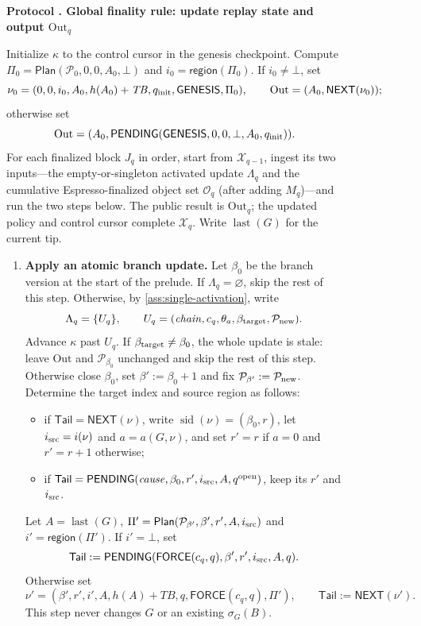 \documentclass[11pt,a4paper]{article}
\newcommand{\TB}{\mathit{TB}}
\newcommand{\tagg}[1]{\ensuremath{\mathsf{#1}}}
\newcounter{protocol}
\newenvironment{protocol}[3][htbp]{\begin{figure}[#1]\refstepcounter{protocol}\label{#2}
\begin{mdframed}[linewidth=.6pt,skipabove=0pt,skipbelow=0pt,
innertopmargin=7pt,innerbottommargin=7pt]\small
\textbf{Protocol \theprotocol. #3}\par\smallskip}{\end{mdframed}\end{figure}}
\begin{document}
\begin{protocol}[H]{alg:global-rule}{Global finality rule: update replay state and output $\mathrm{Out}_q$}
Initialize $\kappa$ to the control cursor in the genesis checkpoint. Compute
$\Pi_0=\tagg{Plan}(\mathcal P_0,0,0,A_0,\bot)$ and
$i_0=\tagg{region}(\Pi_0)$.  If $i_0\ne\bot$, set
\[
 \nu_0=(0,0,i_0,A_0,h(A_0)+\TB,q_{\rm init},\tagg{GENESIS},\Pi_0),
 \qquad \mathrm{Out}=(A_0,\tagg{NEXT}(\nu_0));
\]
otherwise set
\[
 \mathrm{Out}=(A_0,
 \tagg{PENDING}(\tagg{GENESIS},0,0,\bot,A_0,q_{\rm init})).
\]
For each finalized block $J_q$ in order, start from $\mathcal X_{q-1}$,
ingest its two inputs---the empty-or-singleton activated update
$\Lambda_q$ and the cumulative
Espresso-finalized object set $\mathcal O_q$ (after adding $M_q$)---and
run the two steps below. The public result is $\mathrm{Out}_q$; the
updated policy and control cursor complete $\mathcal X_q$. Write
$\operatorname{last}(G)$ for the current tip.
\begin{enumerate}[label=\textbf{\arabic*)},itemsep=3pt]
\item \textbf{Apply an atomic branch update.}
Let $\beta_0$ be the branch version at the start of the prelude. If
$\Lambda_q=\varnothing$, skip the rest of this step. Otherwise, by
\cref{ass:single-activation}, write
\[
 \Lambda_q=\{U_q\},\qquad
 U_q=(\mathit{chain},c_q,\theta_a,\beta_{\rm target},\mathcal P_{\rm new}).
\]
Advance $\kappa$ past $U_q$. If $\beta_{\rm target}\ne\beta_0$, the
whole update is stale: leave $\mathrm{Out}$ and $\mathcal P_{\beta_0}$
unchanged and skip the rest of this step. Otherwise close $\beta_0$, set
$\beta':=\beta_0+1$ and fix $\mathcal P_{\beta'}:=\mathcal P_{\rm new}$.
Determine the target index and source region as follows:
  \begin{itemize}[itemsep=1pt]
  \item if $\mathsf{Tail}=\tagg{NEXT}(\nu)$, write
  $\operatorname{sid}(\nu)=(\beta_0,r)$, let $i_{\rm src}=i(\nu)$ and
  $a=a(G,\nu)$, and set $r'=r$ if $a=0$ and $r'=r+1$ otherwise;
  \item if $\mathsf{Tail}=\tagg{PENDING}
  (\mathit{cause},\beta_0,r',i_{\rm src},A,q^{\rm open})$, keep its $r'$ and
  $i_{\rm src}$.
  \end{itemize}
Let $A=\operatorname{last}(G)$,
$\Pi'=\tagg{Plan}(\mathcal P_{\beta'},\beta',r',A,i_{\rm src})$
and $i'=\tagg{region}(\Pi')$.  If $i'=\bot$, set
\[
 \mathsf{Tail}:=\tagg{PENDING}
 (\tagg{FORCE}(c_q,q),\beta',r',i_{\rm src},A,q).
\]
Otherwise set
\[
 \nu'=(\beta',r',i',A,h(A)+\TB,q,
       \tagg{FORCE}(c_q,q),\Pi'),
 \qquad \mathsf{Tail}:=\tagg{NEXT}(\nu').
\]
This step never changes $G$ or an existing $\sigma_G(B)$.


\end{enumerate}
\end{protocol}
\end{document}
